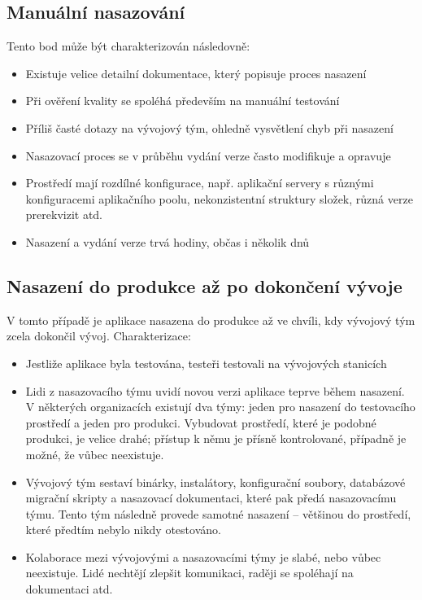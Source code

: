 \subsection{Manuální nasazování}
Tento bod může být charakterizován následovně:

\begin{itemize}
  \item Existuje velice detailní dokumentace, který popisuje proces nasazení
  \item Při ověření kvality se spoléhá především na manuální testování 
  \item Příliš časté dotazy na vývojový tým, ohledně vysvětlení chyb při nasazení
  \item Nasazovací proces se v průběhu vydání verze často modifikuje a opravuje
  \item Prostředí mají rozdílné konfigurace, např. aplikační servery s různými konfiguracemi aplikačního poolu, nekonzistentní struktury složek, různá verze prerekvizit atd.
  \item Nasazení a vydání verze trvá hodiny, občas i několik dnů
\end{itemize}

\subsection{Nasazení do produkce až po dokončení vývoje}
V tomto případě je aplikace nasazena do produkce až ve chvíli, kdy vývojový tým zcela dokončil vývoj. Charakterizace:

\begin{itemize}
  \item Jestliže aplikace byla testována, testeři testovali na vývojových stanicích
  \item Lidi z nasazovacího týmu uvidí novou verzi aplikace teprve během nasazení. V některých organizacích existují dva týmy: jeden pro nasazení do testovacího prostředí a jeden pro produkci. Vybudovat prostředí, které je podobné produkci, je velice drahé; přístup k němu je přísně kontrolované, případně je možné, že vůbec neexistuje.
  \item Vývojový tým sestaví binárky, instalátory, konfigurační soubory, databázové migrační skripty a nasazovací dokumentaci, které pak předá nasazovacímu týmu. Tento tým následně provede samotné nasazení -- většinou do prostředí, které předtím nebylo nikdy otestováno.  
  \item Kolaborace mezi vývojovými a nasazovacími týmy je slabé, nebo vůbec neexistuje. Lidé nechtějí zlepšit komunikaci, raději se spoléhají na dokumentaci atd.
\end{itemize}

